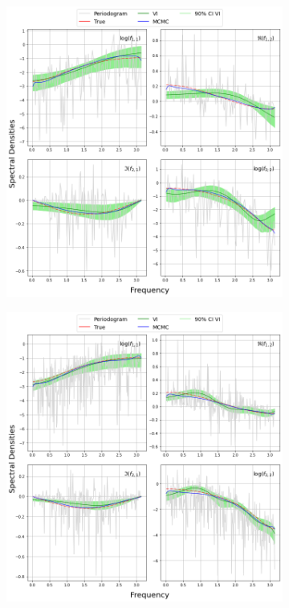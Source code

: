 \documentclass[12pt,a4paper]{article}
\begin{document}
\begin{figure}[H]
\centering
\begin{subfigure}{\textwidth} %
  \centering
  \includegraphics[width=18cm]{VMA(1) with length 256 by variational inference and VNPC.png}
\end{subfigure}

\begin{subfigure}{\textwidth} %
  \centering
  \includegraphics[width=18cm]{VMA(1) with length 512 by variational inference and VNPC.png}
\end{subfigure}


\end{figure}
\end{document}
